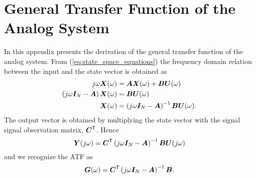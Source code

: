 
\chapter{General Transfer Function of the Analog System}
\label{a:ATF}
In this appendix presents the derivation of the general transfer function of the analog system. From (\ref{eq:state_space_equations}) the frequency domain relation between the input and the state vector is obtained as
\begin{align}
    j\omega \bm{X}(\omega) &= \bm{A} \bm{X}(\omega) + \bm{B}\bm{U}(\omega) \\
    \left(j\omega \bm{I}_{N} - \bm{A} \right)  \bm{X}(\omega) &=  \bm{B}\bm{U}(\omega) \\
    \bm{X}(\omega) &= \left(j\omega \bm{I}_{N} - \bm{A} \right)^{-1}\bm{B}\bm{U}(\omega).
\end{align}
The output vector is obtained by multiplying the state vector with the signal signal observation matrix, $\bm{C}^\mathsf{T}$. Hence
\begin{equation}
    \bm{Y}(j\omega) = \bm{C}^\mathsf{T}\left(j\omega \bm{I}_{N} - \bm{A} \right)^{-1}\bm{B}\bm{U}(j\omega)
\end{equation}
and we recognize the ATF as
\begin{equation}
    \bm{G}(\omega) = \bm{C}^\mathsf{T}\left(j\omega \bm{I}_{N} - \bm{A} \right)^{-1}\bm{B}.
\end{equation}
